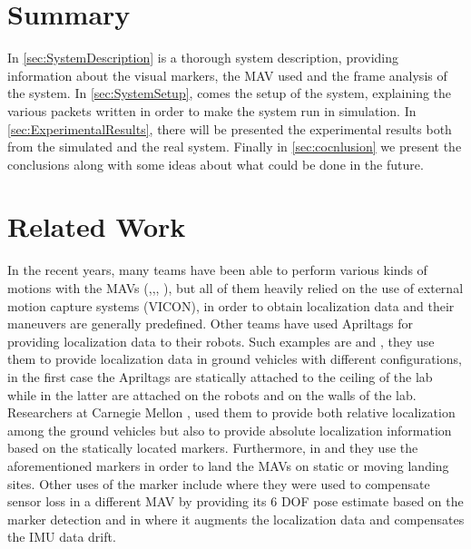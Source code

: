 \section{Summary}
\label{sec:summary}

In \autoref{sec:SystemDescription} is a thorough system description, providing information about the visual markers, the MAV used and the frame analysis of the system. In \autoref{sec:SystemSetup}, comes the setup of the system, explaining the various packets written in order to make the system run in simulation. In \autoref{sec:ExperimentalResults}, there will be presented the experimental results both from the simulated and the real system. Finally in \autoref{sec:cocnlusion} we present the conclusions along with some ideas about what could be done in the future. 
 
 
\section{Related Work}
\label{sec:related_work}

In the recent years, many teams have been able to perform various kinds of motions with the MAVs (\cite{5509452},\cite{hehIFAC11},\cite{trajectoryGenerationAndControl}, \cite{dandreaTedTalk}), but all of them heavily relied on the use of external motion capture systems (VICON\protect\footnotemark), in order to obtain localization data and their maneuvers are generally predefined. Other teams have used Apriltags\cite{olson2011tags} for providing localization data to their robots. Such examples are \cite{lafaroLab} and \cite{robornSwam}, they use them to provide localization data in ground vehicles with different configurations, in the first case the Apriltags are statically attached to the ceiling of the lab while in the latter are attached on the robots and on the walls of the lab. Researchers at Carnegie Mellon \cite{robornSwam}, used them to provide both relative localization among the ground vehicles but also to provide absolute localization information based on the statically  located markers. Furthermore, in \cite{lingkevin2014} and \cite{schaves-2015a} they use the aforementioned markers in order to land the MAVs on static or moving landing sites. Other uses of the marker include  \cite{hoogervorst2015bsc} where they were used to compensate sensor loss in a different MAV by providing its 6 DOF pose estimate based on the marker detection and in \cite{6842304} where it augments the localization data and compensates the IMU data drift. 

